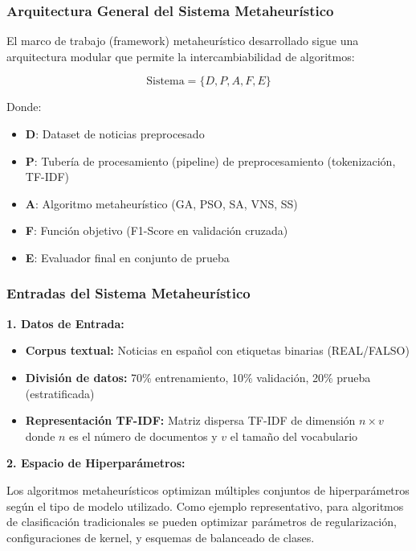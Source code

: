 \subsubsection{Arquitectura General del Sistema Metaheurístico}

El marco de trabajo (framework) metaheurístico desarrollado sigue una arquitectura modular que permite la intercambiabilidad de algoritmos:

\begin{equation}
\text{Sistema} = \{D, P, A, F, E\}
\end{equation}

Donde:
\begin{itemize}
    \item \textbf{D}: Dataset de noticias preprocesado
    \item \textbf{P}: Tubería de procesamiento (pipeline) de preprocesamiento (tokenización, TF-IDF)
    \item \textbf{A}: Algoritmo metaheurístico (GA, PSO, SA, VNS, SS)
    \item \textbf{F}: Función objetivo (F1-Score en validación cruzada)
    \item \textbf{E}: Evaluador final en conjunto de prueba
\end{itemize}

\subsubsection{Entradas del Sistema Metaheurístico}

\textbf{1. Datos de Entrada:}
\begin{itemize}
    \item \textbf{Corpus textual:} Noticias en español con etiquetas binarias (REAL/FALSO)
    \item \textbf{División de datos:} 70\% entrenamiento, 10\% validación, 20\% prueba (estratificada)
    \item \textbf{Representación TF-IDF:} Matriz dispersa TF-IDF de dimensión $n \times v$ donde $n$ es el número de documentos y $v$ el tamaño del vocabulario
\end{itemize}

\textbf{2. Espacio de Hiperparámetros:}

Los algoritmos metaheurísticos optimizan múltiples conjuntos de hiperparámetros según el tipo de modelo utilizado. Como ejemplo representativo, para algoritmos de clasificación tradicionales se pueden optimizar parámetros de regularización, configuraciones de kernel, y esquemas de balanceado de clases.

